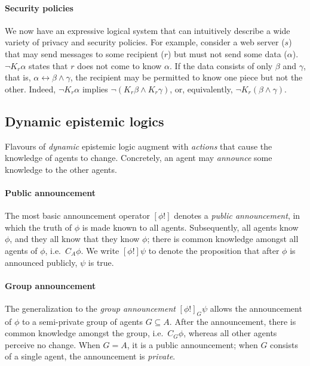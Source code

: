 \documentclass[letterpaper,twocolumn,10pt]{article}
\begin{document}
\paragraph{Security policies}
We now have an expressive logical system that can intuitively describe a wide variety of privacy and security policies.
For example, consider a web server (\(s\)) that may send messages to some recipient (\(r\)) but must not send some data (\(\alpha\)).
\(\lnot K_r \alpha\) states that \(r\) does not come to know \(\alpha\).
If the data consists of only \(\beta\) and \(\gamma\), that is, \(\alpha \leftrightarrow \beta \land \gamma\), the recipient may be permitted to know one piece but not the other.
Indeed, \(\lnot K_{r} \alpha\) implies \(\lnot (K_{r} \beta \land K_{r} \gamma)\), or, equivalently, \(\lnot K_{r} (\beta \land \gamma)\).

\subsection{Dynamic epistemic logics}
\label{sec:background-del}

Flavours of \emph{dynamic} epistemic logic augment with \emph{actions} that cause the knowledge of agents to change.
Concretely, an agent may \emph{announce} some knowledge to the other agents.

\paragraph{Public announcement}
The most basic announcement operator \([\phi!]\) denotes a \emph{public announcement}, in which the truth of \(\phi\) is made known to all agents.
Subsequently, all agents know \(\phi\), and they all know that they know \(\phi\);
there is common knowledge amongst all agents of \(\phi\), i.e.\ \(C_A \phi\).
We write \([\phi!] \psi\) to denote the proposition that after \(\phi\) is announced publicly, \(\psi\) is true.

\paragraph{Group announcement}
The generalization to the \emph{group announcement} \([\phi!]_G \psi\) allows the announcement of \(\phi\) to a semi-private group of agents \(G \subseteq A\).
After the announcement, there is common knowledge amongst the group, i.e.\ \(C_G \phi\), whereas all other agents perceive no change.
When \(G = A\), it is a public announcement; when \(G\) consists of a single agent, the announcement is \emph{private}.
\end{document}

